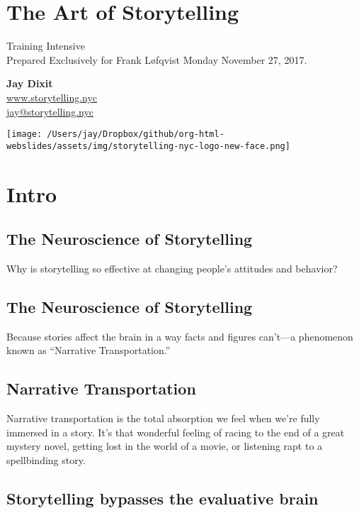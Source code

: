 \documentclass[12pt]{article}
\author{Jay Dixit}
\date{\today}
\title{}
\begin{document}
\tableofcontents
\newpage
\section{The Art of Storytelling}
\label{sec:org3c0fedb}
Training Intensive \\
Prepared Exclusively for Frank Løfqvist
Monday November 27, 2017.

\textbf{Jay Dixit} \\
\href{http://www.storytelling.nyc}{www.storytelling.nyc} \\
\href{mailto:jay@storytelling.nyc}{jay@storytelling.nyc} \\

\begin{center}
\texttt{[image: /Users/jay/Dropbox/github/org-html-webslides/assets/img/storytelling-nyc-logo-new-face.png]}
\end{center}

\section{Intro}
\label{sec:orgee2c868}

\subsection{The Neuroscience of Storytelling}
\label{sec:orge35c3b0}
Why is storytelling so effective at changing people's attitudes and behavior?


\subsection{The Neuroscience of Storytelling}
\label{sec:org9a5d508}
Because stories affect the brain in a way facts and figures can't---a phenomenon known as ``Narrative Transportation.''

\subsection{Narrative Transportation}
\label{sec:orge239ae4}

Narrative transportation is the total absorption we feel when we're fully immersed in a story. It's that wonderful feeling of racing to the end of a great mystery novel, getting lost in the world of a movie, or listening rapt to a spellbinding story.

\subsection{Storytelling bypasses the evaluative brain}
\label{sec:org7dbbcec}
\end{document}
